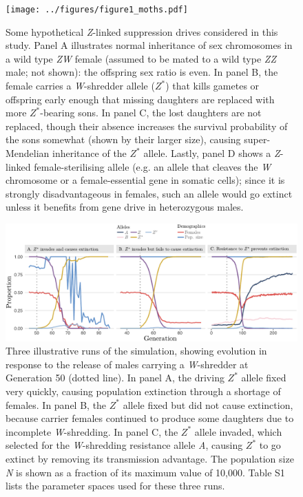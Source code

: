 \documentclass[]{rsos}%
\begin{document}
\begin{figure}[h]
\centering
\texttt{[image: ../figures/figure1\_moths.pdf]}
\caption{\footnotesize{Some hypothetical \textit{Z}-linked suppression drives considered in this study. Panel A illustrates normal inheritance of sex chromosomes in a wild type \textit{ZW} female (assumed to be mated to a wild type \textit{ZZ} male; not shown): the offspring sex ratio is even. In panel B, the female carries a \textit{W}-shredder allele ($Z^*$) that kills gametes or offspring early enough that missing daughters are replaced with more $Z^*$-bearing sons. In panel C, the lost daughters are not replaced, though their absence increases the survival probability of the sons somewhat (shown by their larger size), causing super-Mendelian inheritance of the $Z^*$ allele. Lastly, panel D shows a \textit{Z}-linked female-sterilising allele (e.g. an allele that cleaves the \textit{W} chromosome or a female-essential gene in somatic cells); since it is strongly disadvantageous in females, such an allele would go extinct unless it benefits from gene drive in heterozygous males.}}
\end{figure}
\newpage

\begin{figure}[h]
\centering
\includegraphics[width=1.0\textwidth]{../figures/fig_2_inkscape.pdf}
\caption{\footnotesize{Three illustrative runs of the simulation, showing evolution in response to the release of males carrying a \textit{W}-shredder at Generation 50 (dotted line). In panel A, the driving $Z^*$ allele fixed very quickly, causing population extinction through a shortage of females. In panel B, the $Z^*$ allele fixed but did not cause extinction, because carrier females continued to produce some daughters due to incomplete \textit{W}-shredding. In panel C, the $Z^*$ allele invaded, which selected for the \textit{W}-shredding resistance allele \textit{A}, causing $Z^*$ to go extinct by removing its transmission advantage. The population size \textit{N} is shown as a fraction of its maximum value of 10,000. Table S1 lists the parameter spaces used for these three runs.}}
\end{figure}
\newpage
\end{document}
